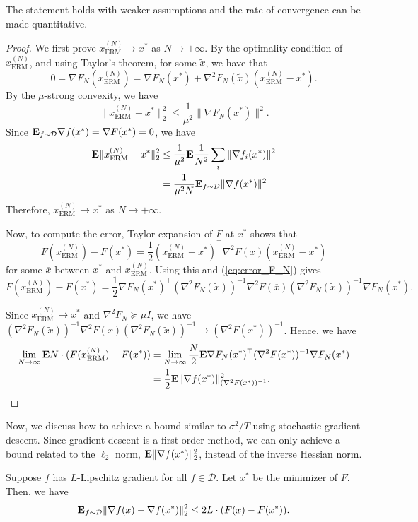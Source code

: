 \begin{rem*}
The statement holds with weaker assumptions and the rate of convergence
can be made quantitative.
\end{rem*}
\begin{proof}
We first prove $x^{(N)}_{\mathrm{ERM}}\rightarrow x^{*}$ as $N\rightarrow+\infty$.
By the optimality condition of $x^{(N)}_{\mathrm{ERM}}$, and using
Taylor's theorem, for some $\widetilde{x}$, we have that
\begin{equation}
0=\nabla F_{N}(x^{(N)}_{\mathrm{ERM}})=\nabla F_{N}(x^{*})+\nabla^{2}F_{N}(\widetilde{x})(x^{(N)}_{\mathrm{ERM}}-x^{*}).\label{eq:error_F_N}
\end{equation}
By the $\mu$-strong convexity, we have
\[
\|x^{(N)}_{\mathrm{ERM}}-x^{*}\|^{2}_{2}\leq\frac{1}{\mu^{2}}\|\nabla F_{N}(x^{*})\|^{2}.
\]
Since $\mathbf{E}_{f\sim\mathcal{D}}\nabla f(x^{*})=\nabla F(x^{*})=0$, we
have
\begin{align*}
\mathbf{E}\|x^{(N)}_{\mathrm{ERM}}-x^{*}\|^{2}_{2} & \leq\frac{1}{\mu^{2}}\mathbf{E}\frac{1}{N^{2}}\sum_{i}\|\nabla f_{i}(x^{*})\|^{2}\\
 & =\frac{1}{\mu^{2}N}\mathbf{E}_{f\sim\mathcal{D}}\|\nabla f(x^{*})\|^{2}
\end{align*}
Therefore, $x^{(N)}_{\mathrm{ERM}}\rightarrow x^{*}$ as $N\rightarrow+\infty$.

Now, to compute the error, Taylor expansion of $F$ at $x^{*}$ shows
that
\[
F(x^{(N)}_{\mathrm{ERM}})-F(x^{*})=\frac{1}{2}(x^{(N)}_{\mathrm{ERM}}-x^{*})^{\top}\nabla^{2}F(\overline{x})(x^{(N)}_{\mathrm{ERM}}-x^{*})
\]
for some $\overline{x}$ between $x^{*}$ and $x^{(N)}_{\mathrm{ERM}}$.
Using this and (\ref{eq:error_F_N}) gives
\[
F(x^{(N)}_{\mathrm{ERM}})-F(x^{*})=\frac{1}{2}\nabla F_{N}(x^{*})^{\top}(\nabla^{2}F_{N}(\widetilde{x}))^{-1}\nabla^{2}F(\overline{x})(\nabla^{2}F_{N}(\widetilde{x}))^{-1}\nabla F_{N}(x^{*}).
\]

Since $x^{(N)}_{\mathrm{ERM}}\rightarrow x^{*}$ and $\nabla^{2}F_{N}\succeq\mu I$,
we have $(\nabla^{2}F_{N}(\widetilde{x}))^{-1}\nabla^{2}F(\overline{x})(\nabla^{2}F_{N}(\widetilde{x}))^{-1}\rightarrow(\nabla^{2}F(x^{*}))^{-1}$.
Hence, we have
\begin{align*}
\lim_{N\rightarrow\infty}\mathbf{E} N\cdot(F(x^{(N)}_{\mathrm{ERM}})-F(x^{*})) & =\lim_{N\rightarrow\infty}\frac{N}{2}\mathbf{E}\nabla F_{N}(x^{*})^{\top}(\nabla^{2}F(x^{*}))^{-1}\nabla F_{N}(x^{*})\\
 & =\frac{1}{2}\mathbf{E}\|\nabla f(x^{*})\|^{2}_{(\nabla^{2}F(x^{*}))^{-1}}.
\end{align*}
\end{proof}
Now, we discuss how to achieve a bound similar to $\sigma^{2}/T$
using stochastic gradient descent. Since gradient descent is a first-order
method, we can only achieve a bound related to the $\ell_{2}$ norm,
$\mathbf{E}\|\nabla f(x^{*})\|^{2}_{2}$, instead of the inverse Hessian norm. 
\begin{lem}
\label{lem:change_variance}Suppose $f$ has $L$-Lipschitz gradient
for all $f\in\mathcal{D}$. Let $x^{*}$ be the minimizer of $F$.
Then, we have
\[
\mathbf{E}_{f\sim\mathcal{D}}\|\nabla f(x)-\nabla f(x^{*})\|^{2}_{2}\leq2L\cdot(F(x)-F(x^{*})).
\]
\end{lem}

